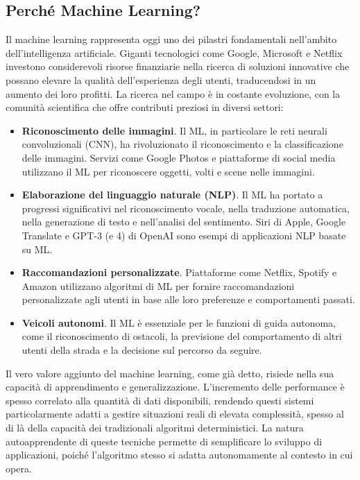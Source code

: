 \documentclass[12pt,a4paper,twoside,openright]{book}
\begin{document}
\subsection{Perché Machine Learning?}
Il machine learning rappresenta oggi uno dei pilastri fondamentali nell'ambito dell'intelligenza artificiale. Giganti tecnologici come Google, Microsoft e Netflix investono considerevoli risorse finanziarie nella ricerca di soluzioni innovative che possano elevare la qualità dell'esperienza degli utenti, traducendosi in un aumento dei loro profitti. La ricerca nel campo è in costante evoluzione, con la comunità scientifica che offre contributi preziosi in diversi settori:
\begin{itemize}
    \item \textbf{Riconoscimento delle immagini}. 
    Il ML, in particolare le reti neurali convoluzionali (CNN), ha rivoluzionato il riconoscimento e la classificazione delle immagini. Servizi come Google Photos e piattaforme di social media utilizzano il ML per riconoscere oggetti, volti e scene nelle immagini.
    \item \textbf{Elaborazione del linguaggio naturale (NLP)}. Il ML ha portato a progressi significativi nel riconoscimento vocale, nella traduzione automatica, nella generazione di testo e nell'analisi del sentimento. Siri di Apple, Google Translate e GPT-3 (e 4) di OpenAI sono esempi di applicazioni NLP basate su ML.
    \item \textbf{Raccomandazioni personalizzate}. Piattaforme come Netflix, Spotify e Amazon utilizzano algoritmi di ML per fornire raccomandazioni personalizzate agli utenti in base alle loro preferenze e comportamenti passati.
    \item \textbf{Veicoli autonomi}. Il ML è essenziale per le funzioni di guida autonoma, come il riconoscimento di ostacoli, la previsione del comportamento di altri utenti della strada e la decisione sul percorso da seguire.
\end{itemize}

Il vero valore aggiunto del machine learning, come già detto, risiede nella sua capacità di apprendimento e generalizzazione. L'incremento delle performance è spesso correlato alla quantità di dati disponibili, rendendo questi sistemi particolarmente adatti a gestire situazioni reali di elevata complessità, spesso al di là della capacità dei tradizionali algoritmi deterministici. La natura autoapprendente di queste tecniche permette di semplificare lo sviluppo di applicazioni, poiché l'algoritmo stesso si adatta autonomamente al contesto in cui opera.
\end{document}
